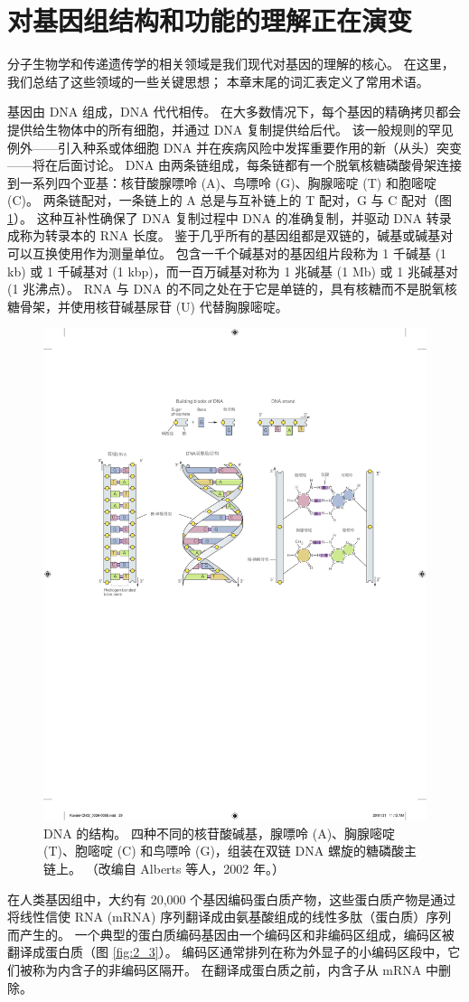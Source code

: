 \section{对基因组结构和功能的理解正在演变}
分子生物学和传递遗传学的相关领域是我们现代对基因的理解的核心。 
在这里，我们总结了这些领域的一些关键思想； 本章末尾的词汇表定义了常用术语。


基因由 DNA 组成，DNA 代代相传。 
在大多数情况下，每个基因的精确拷贝都会提供给生物体中的所有细胞，并通过 DNA 复制提供给后代。 
该一般规则的罕见例外——引入种系或体细胞 DNA 并在疾病风险中发挥重要作用的新（从头）突变——将在后面讨论。 DNA 由两条链组成，每条链都有一个脱氧核糖磷酸骨架连接到一系列四个亚基：核苷酸腺嘌呤 (A)、鸟嘌呤 (G)、胸腺嘧啶 (T) 和胞嘧啶 (C)。 
两条链配对，一条链上的 A 总是与互补链上的 T 配对，G 与 C 配对（图 \ref{fig:2_2}）。 
这种互补性确保了 DNA 复制过程中 DNA 的准确复制，并驱动 DNA 转录成称为转录本的 RNA 长度。 
鉴于几乎所有的基因组都是双链的，碱基或碱基对可以互换使用作为测量单位。 
包含一千个碱基对的基因组片段称为 1 千碱基 (1 kb) 或 1 千碱基对 (1 kbp)，而一百万碱基对称为 1 兆碱基 (1 Mb) 或 1 兆碱基对 (1 兆沸点）。 
RNA 与 DNA 的不同之处在于它是单链的，具有核糖而不是脱氧核糖骨架，并使用核苷碱基尿苷 (U) 代替胸腺嘧啶。

\begin{figure}[htbp]
	\centering
	\includegraphics[width=0.5\linewidth]{chap02/fig_2_2}
	\caption{DNA 的结构。 
		四种不同的核苷酸碱基，腺嘌呤 (A)、胸腺嘧啶 (T)、胞嘧啶 (C) 和鸟嘌呤 (G)，组装在双链 DNA 螺旋的糖磷酸主链上。 
		（改编自 Alberts 等人，2002 年。）}
	\label{fig:2_2}
\end{figure}


在人类基因组中，大约有 20,000 个基因编码蛋白质产物，这些蛋白质产物是通过将线性信使 RNA (mRNA) 序列翻译成由氨基酸组成的线性多肽（蛋白质）序列而产生的。
一个典型的蛋白质编码基因由一个编码区和非编码区组成，编码区被翻译成蛋白质（图 \ref{fig:2_3}）。 
编码区通常排列在称为外显子的小编码区段中，它们被称为内含子的非编码区隔开。 
在翻译成蛋白质之前，内含子从 mRNA 中删除。

